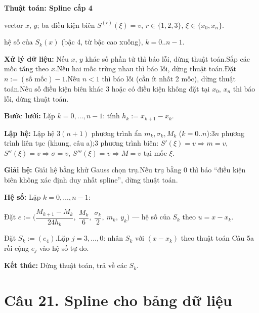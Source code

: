 \documentclass[11pt,a4paper]{article}
\newenvironment{thuattoan}[1]
  {\par\medskip\noindent\textbf{Thuật toán: #1}\begin{description}[style=standard,align=left,leftmargin=4.3em,labelwidth=3.9em,labelsep=0.4em,itemsep=1pt,topsep=3pt,font=\normalfont\bfseries]}
  {\end{description}}
\newenvironment{con}
  {\begin{description}[style=standard,align=left,leftmargin=2.1em,labelwidth=1.8em,labelsep=0.3em,itemsep=0pt,topsep=1pt,font=\normalfont]}
  {\end{description}}
\newcommand{\thut}{\newline\hspace*{1.2em}}
\begin{document}
\begin{thuattoan}{Spline cấp 4}
\item[Input:] vector $x$, $y$; ba điều kiện biên $S^{(r)}(\xi)=v$, $r\in\{1,2,3\}$, $\xi\in\{x_0,x_n\}$.
\item[Output:] hệ số của $S_k(x)$ (bậc 4, từ bậc cao xuống), $k=0..n-1$.
\item[Bước 0:] \textbf{Xử lý dữ liệu:} Nếu $x$, $y$ khác số phần tử thì báo lỗi, dừng thuật toán.\newline Sắp các mốc tăng theo $x$.\newline Nếu hai mốc trùng nhau thì báo lỗi, dừng thuật toán.\newline Đặt $n:=(\text{số mốc})-1$.\newline Nếu $n<1$ thì báo lỗi (cần ít nhất 2 mốc), dừng thuật toán.\newline Nếu số điều kiện biên khác $3$ hoặc có điều kiện không đặt tại $x_0$, $x_n$ thì báo lỗi, dừng thuật toán.
\item[Bước 1:] \textbf{Bước lưới:} Lặp $k=0,\dots,n-1$: tính $h_k:=x_{k+1}-x_k$.
\item[Bước 2:] \textbf{Lập hệ:} Lập hệ $3(n+1)$ phương trình ẩn $m_k,\sigma_k,M_k$ ($k=0..n$):\thut $3n$ phương trình liên tục (khung, câu a);\thut 3 phương trình biên: $S'(\xi)=v\Rightarrow m=v$, $S''(\xi)=v\Rightarrow\sigma=v$, $S'''(\xi)=v\Rightarrow M=v$ tại mốc $\xi$.
\item[Bước 3:] \textbf{Giải hệ:} Giải hệ bằng khử Gauss chọn trụ.\newline Nếu trụ bằng $0$ thì báo ``điều kiện biên không xác định duy nhất spline'', dừng thuật toán.
\item[Bước 4:] \textbf{Hệ số:} Lặp $k=0,\dots,n-1$:
  \begin{con}
  \item[4.1:] Đặt $e:=\Big(\dfrac{M_{k+1}-M_k}{24h_k},\ \dfrac{M_k}{6},\ \dfrac{\sigma_k}{2},\ m_k,\ y_k\Big)$ — hệ số của $S_k$ theo $u=x-x_k$.
  \item[4.2:] Đặt $S_k:=(e_4)$.\newline Lặp $j=3,\dots,0$: nhân $S_k$ với $(x-x_k)$ theo thuật toán Câu 5a rồi cộng $e_j$ vào hệ số tự do.
  \end{con}
\item[Bước 5:] \textbf{Kết thúc:} Dừng thuật toán, trả về các $S_k$.
\end{thuattoan}

\section{Câu 21. Spline cho bảng dữ liệu}
\end{document}
